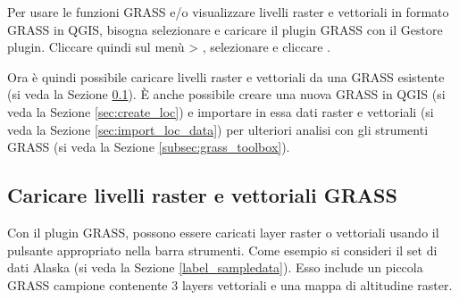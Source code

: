 Per usare le funzioni GRASS e/o visualizzare livelli raster e vettoriali in
formato GRASS in QGIS, bisogna selezionare e caricare il plugin GRASS con il
Gestore plugin. 
Cliccare quindi sul menù  > , 
selezionare  e cliccare . 

Ora è quindi possibile caricare livelli raster e vettoriali da una 
GRASS esistente (si veda la Sezione \ref{sec:load_grassdata}). È anche
possibile creare una nuova  GRASS in QGIS (si veda la
Sezione \ref{sec:create_loc}) e importare in essa dati raster e vettoriali (si
veda la Sezione \ref{sec:import_loc_data}) per ulteriori analisi con gli
strumenti GRASS (si veda la Sezione \ref{subsec:grass_toolbox}).

\subsection{Caricare livelli raster e vettoriali GRASS}\label{sec:load_grassdata}

Con il plugin GRASS, possono essere caricati layer raster o vettoriali
usando il pulsante appropriato nella barra strumenti. Come esempio si
consideri il set di dati Alaska (si veda la Sezione \ref{label_sampledata}).
Esso include un piccola  GRASS campione contenente 3 layers
vettoriali e una mappa di altitudine raster.

